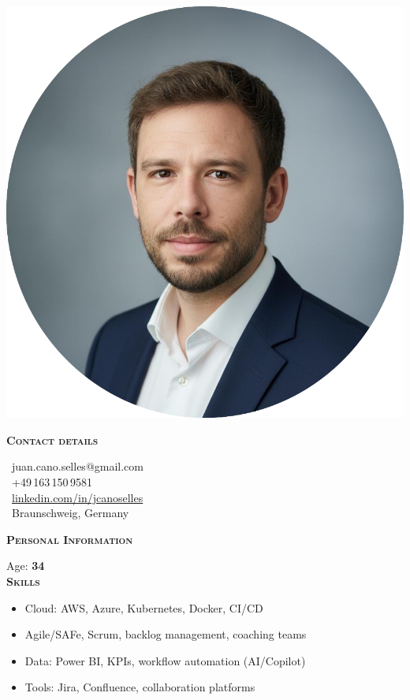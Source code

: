 \documentclass[11pt, a4paper]{article}
\newcommand{\headleft}[1]{\vspace*{2ex}\textsc{\textbf{\color{softwhite}#1}}\par%
    \vspace*{-1.2ex}{\color{softwhite}\hrulefill}\par\vspace*{0.7ex}}
\begin{document}
\pagestyle{empty}
\setlength{\parindent}{0pt}
\setlength{\parskip}{0pt}
\raggedbottom

\noindent
\begin{minipage}[t]{0.40\textwidth} %
\colorbox{cvblue!90}{
\begin{minipage}[t][\textheight][t]{0.68\textwidth} %
\raggedright
\color{softwhite}

\vspace*{6mm}
\begin{center}
\includegraphics[width=0.9\linewidth]{Resume_Juan_Cano.png}
\end{center}

\headleft{Contact details}
\small
\MVAt\ {\small juan.cano.selles@gmail.com} \\[0.4ex]
\Mobilefone\ +49\,163\,150\,9581 \\[0.5ex]
\Mundus\ \href{https://www.linkedin.com/in/jcanoselles/}{linkedin.com/in/jcanoselles} \\[0.1ex]
\Letter\ Braunschweig, Germany
\normalsize

\headleft{Personal Information}
Age: \textbf{34} \\[0.5ex]

\headleft{Skills}
\begin{itemize}[leftmargin=*, itemsep=0.5ex]
\item Cloud: AWS, Azure, Kubernetes, Docker, CI/CD
\item Agile/SAFe, Scrum, backlog management, coaching teams
\item Data: Power BI, KPIs, workflow automation (AI/Copilot)
\item Tools: Jira, Confluence, collaboration platforms
\end{itemize} 


\end{minipage}}
\end{minipage}
\end{document}
